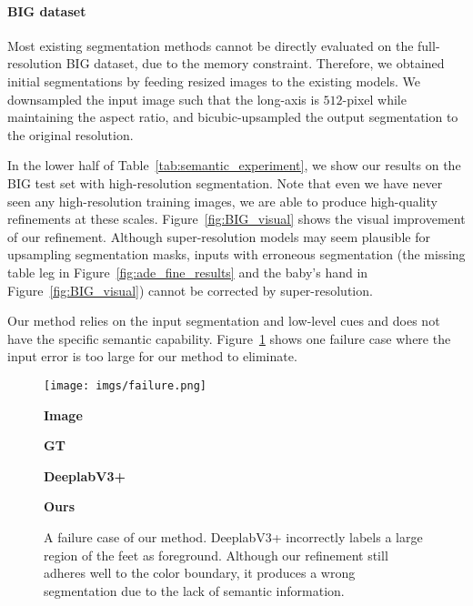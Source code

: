 \documentclass[10pt,twocolumn,letterpaper]{article}
\begin{document}
\vspace{-0.1in}
\paragraph{BIG dataset}
Most existing segmentation methods cannot be directly evaluated on the full-resolution BIG dataset, due to the memory constraint. Therefore, we obtained initial segmentations by feeding resized images to the existing models. We downsampled the input image such that the long-axis is $512$-pixel while maintaining the aspect ratio, and bicubic-upsampled the output segmentation to the original resolution.

In the lower half of Table~\ref{tab:semantic_experiment}, we show our results on the BIG test set with high-resolution segmentation. Note that even we have never seen any high-resolution training images, we are able to produce high-quality refinements at these scales. Figure~\ref{fig:BIG_visual} shows the visual improvement of our refinement.
Although super-resolution models \cite{dong2015image, wang2018esrgan} may seem plausible for upsampling segmentation masks, inputs with erroneous segmentation (\eg the missing table leg in Figure~\ref{fig:ade_fine_results} and the baby's hand in Figure~\ref{fig:BIG_visual}) cannot be corrected by super-resolution.

Our method relies on the input segmentation and low-level cues and does not have the specific semantic capability.
Figure~\ref{fig:failure} shows one failure case where the input error is too large for our method to eliminate.

\begin{figure}[t]
\centering
	\texttt{[image: imgs/failure.png]}
    	\begin{center}
        	\textbf{Image}
    	\end{center}
	\endminipage\hfill
    	\begin{center}
        	\textbf{GT}
    	\end{center}
	\endminipage\hfill
    	\begin{center}
        	\textbf{DeeplabV3+}
    	\end{center}
	\endminipage\hfill
    	\begin{center}
        	\textbf{Ours}
    	\end{center}
	\endminipage\hfill
	\caption{A failure case of our method. DeeplabV3+ incorrectly labels a large region of the feet as foreground. Although our refinement still adheres well to the color boundary, it produces a wrong segmentation due to the lack of semantic information. }
	\label{fig:failure}
	\vspace{-0.15in}
\end{figure}
\end{document}
